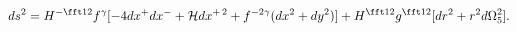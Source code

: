 \begin{equation}
ds^2=H^{-\fft12}f^\gamma[-4dx^+dx^-+{\cal H}dx^{+\,2}
+f^{-2\gamma} (dx^2+dy^2)]+H^{\fft12}g^{\fft12} [dr^2+r^2d\Omega_5^2].
\end{equation}

